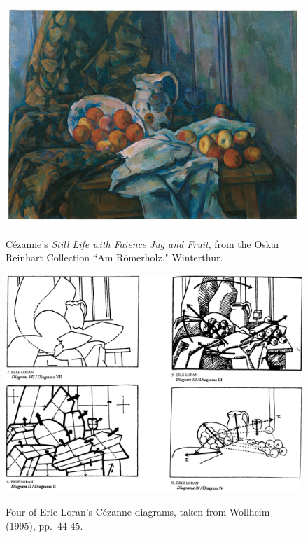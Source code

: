 \begin{figure}
	\centering
	\caption{C\'{e}zanne's \emph{Still Life with Faience Jug and Fruit}, from the Oskar Reinhart Collection ``Am R\"{o}merholz," Winterthur.}
	\includegraphics[width=6in]{cezanne.png}
	\label{cezanne}
\end{figure}

\begin{figure}
	\centering
	\caption{Four of Erle Loran's C\'{e}zanne diagrams, taken from Wollheim (1995), pp.\ 44-45.}
	\includegraphics[width=6in]{loran_diagrams.png}
	\label{loran_diagrams}
\end{figure}

